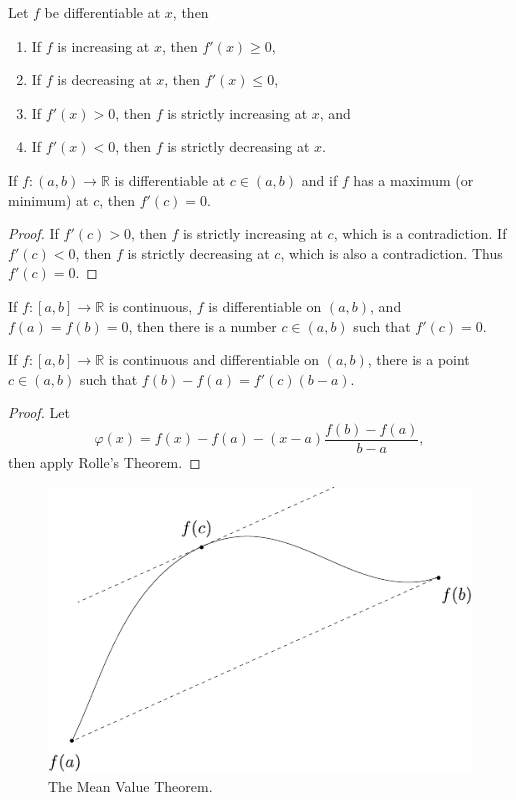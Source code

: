 \documentclass[10pt]{report}
\begin{document}
\begin{thrm}[]
Let $f$ be differentiable at $x$, then
\begin{enumerate}
	\item If $f$ is increasing at $x$, then $f'(x) \geq 0$,
	\item If $f$ is decreasing at $x$, then $f'(x) \leq 0$,
	\item If $f'(x) > 0$, then $f$ is strictly increasing at $x$, and
	\item If $f'(x) < 0$, then $f$ is strictly decreasing at $x$.
\end{enumerate}
\end{thrm}

\begin{prop}
	If $f:(a,b) \to \mathbb{R}$ is differentiable at $c \in (a,b)$ and if $f$ has a maximum (or minimum) at $c$, then $f'(c) = 0$.
\end{prop}
\begin{proof}
	If $f'(c) > 0$, then $f$ is strictly increasing at $c$, which is a contradiction. If $f'(c) < 0$, then $f$ is strictly decreasing at $c$, which is also a contradiction. Thus $f'(c)=0$.
\end{proof}

\begin{thrm}[Rolle's]
	If $f:[a,b] \to \mathbb{R}$ is continuous, $f$ is differentiable on $(a,b)$, and $f(a) = f(b) = 0$, then there is a number $c \in (a,b)$ such that $f'(c) = 0$.
\end{thrm}

\begin{thrm}
	If $f:[a,b] \to \mathbb{R}$ is continuous and differentiable on $(a,b)$, there is a point $c \in (a,b)$ such that $f(b) - f(a) = f'(c) (b-a)$.
\end{thrm}
\begin{proof}
	Let \[\varphi(x) = f(x)-f(a)-(x-a)\frac{f(b)-f(a)}{b-a}, \]
	then apply Rolle's Theorem.
\end{proof}

\begin{figure}[H]
	\centering
	\includegraphics[scale=0.7]{fig/mean-value.pdf}
	\caption{The Mean Value Theorem.}
\end{figure}
\end{document}
